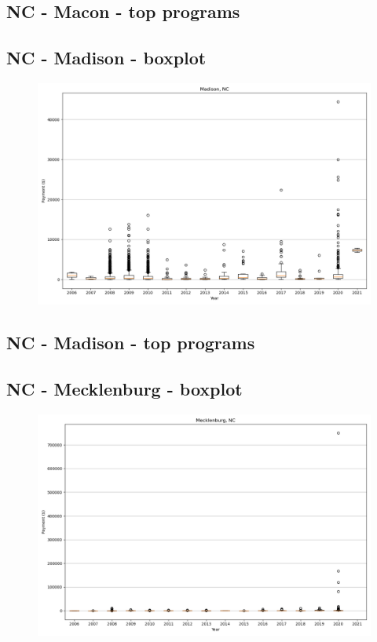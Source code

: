 \subsection*{NC - Macon - top programs}

\newpage
\subsection*{NC - Madison - boxplot}
\begin{figure}[h]
\centering
\includegraphics[width=7in]{../output/boxplots/counties/Madison-NC_boxplot.png}
\end{figure}


\subsection*{NC - Madison - top programs}

\newpage
\subsection*{NC - Mecklenburg - boxplot}
\begin{figure}[h]
\centering
\includegraphics[width=7in]{../output/boxplots/counties/Mecklenburg-NC_boxplot.png}
\end{figure}


